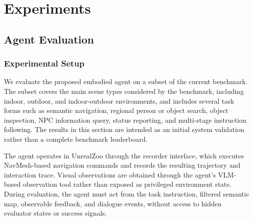 
\section{Experiments}
\label{sec:experiments}

\subsection{Agent Evaluation}
\label{subsec:exp-agent}


\subsubsection{Experimental Setup}
\label{subsubsec:agent-setup}

We evaluate the proposed embodied agent on a subset of the current benchmark. The subset covers the main scene types considered by the benchmark, including indoor, outdoor, and indoor-outdoor environments, and includes several task forms such as semantic navigation, regional person or object search, object inspection, NPC information query, status reporting, and multi-stage instruction following. The results in this section are intended as an initial system validation rather than a complete benchmark leaderboard.

The agent operates in UnrealZoo through the recorder interface, which executes NavMesh-based navigation commands and records the resulting trajectory and interaction trace. Visual observations are obtained through the agent's VLM-based observation tool rather than exposed as privileged environment state. During evaluation, the agent must act from the task instruction, filtered semantic map, observable feedback, and dialogue events, without access to hidden evaluator states or success signals.


